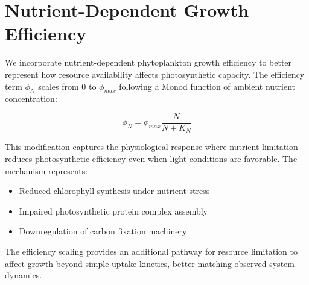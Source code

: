 \section{Nutrient-Dependent Growth Efficiency}

We incorporate nutrient-dependent phytoplankton growth efficiency to better represent how resource availability affects photosynthetic capacity. The efficiency term $\phi_N$ scales from 0 to $\phi_{max}$ following a Monod function of ambient nutrient concentration:

\[\phi_N = \phi_{max} \frac{N}{N + K_N}\]

This modification captures the physiological response where nutrient limitation reduces photosynthetic efficiency even when light conditions are favorable. The mechanism represents:

\begin{itemize}
\item Reduced chlorophyll synthesis under nutrient stress
\item Impaired photosynthetic protein complex assembly
\item Downregulation of carbon fixation machinery
\end{itemize}

The efficiency scaling provides an additional pathway for resource limitation to affect growth beyond simple uptake kinetics, better matching observed system dynamics.
